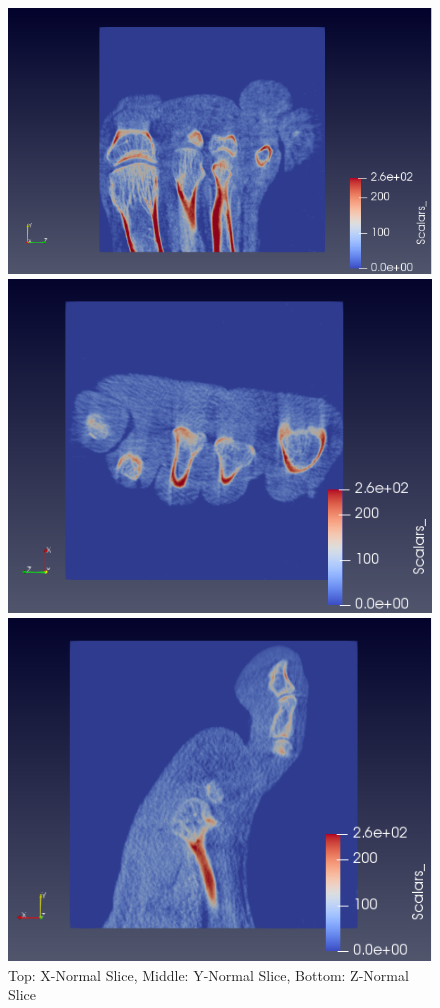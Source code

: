\documentclass[a4paper,11pt]{article}
\theoremstyle{mytheor}
\begin{document}
\begin{figure}[!h]
    \centering
    \includegraphics[scale = 0.6]{Q4_X.PNG}
    
    \vspace{1 cm}
    \includegraphics[scale = 0.7]{Q4_Y.PNG}
    
    \vspace{1 cm}
    \includegraphics[scale = 0.7]{Q4_Z.PNG}
    \caption{Top: X-Normal Slice, Middle: Y-Normal Slice, Bottom: Z-Normal Slice}
    \label{fig:q32}
\end{figure}
\end{document}
